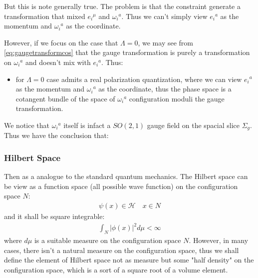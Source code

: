 But this is note generally true. The problem is that the constraint
generate a transformation that mixed $ e_i{}^\mu $ and $ \omega_i{}^a
$. Thus we can't simply view $ e_i{}^a $ as the momentum and $
\omega_i{}^a $ as the coordinate.

However, if we focus on the case that $ \Lambda = 0 $, we may see
from \cref{eq:gaugetransformcos} that the gauge transformation is
purely a transformation on $ \omega_i{}^a $ and doesn't mix with $
e_i{}^a $. Thus:
\begin{itemize}
  \item for $ \Lambda = 0 $ case admits a real polarization
    quantization, where we can view $ e_i{}^a
    $ as the momentum and $ \omega_i{}^a $ as the coordinate, thus the
    phase space is a cotangent bundle of the space of $ \omega_i{}^a $
    configuration moduli the gauge transformation.
\end{itemize}
We notice that $ \omega_i{}^a $ itself is infact a $ SO(2,1) $ gauge
field on the spacial slice $ \Sigma_g $. Thus we have the conclusion that:

\subsubsection{Hilbert Space}

Then as a analogue to the standard quantum mechanics. The Hilbert
space can be view as a function space (all possible wave function) on
the configuration space $ N $:
\begin{align}
  \psi(x) \in \mathcal{H} \quad x \in N
\end{align}
and it shall be square integrable:
\begin{align}
  \int_{N} |\phi(x)|^2 d \mu< \infty
\end{align}
where $ d \mu $ is a suitable measure on the configuration space $ N
$. However, in many cases, there isn't a natural measure on the
configuration space, thus we shall define the element of Hilbert
space not as measure but some "half density" on the configuration
space, which is a sort of a square root of a volume element.

